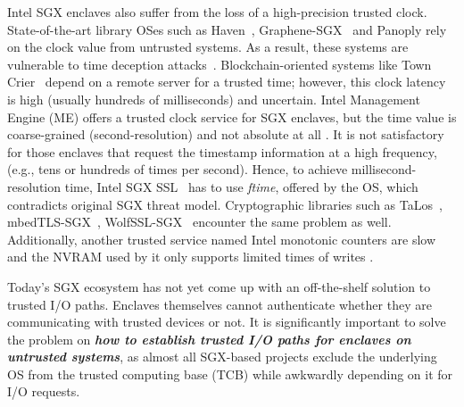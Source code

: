 \documentclass[journal,twocolumn,letterpaper,10pt]{IEEEtran}
\begin{document}
Intel SGX enclaves also suffer from the loss of a high-precision trusted clock. State-of-the-art library OSes such as Haven~\cite{DBLP:journals/tocs/BaumannPH15}, Graphene-SGX~\cite{DBLP:conf/usenix/TsaiPV17} and Panoply \cite{shinde_panoply:_2017} rely on the clock value from  untrusted systems. As a result, these systems are vulnerable to time deception attacks~\cite{DBLP:conf/ccs/ChenZRZ17}. Blockchain-oriented systems like Town Crier~\cite{DBLP:conf/ccs/ZhangCCJS16} depend on a remote server for a trusted time; however, this clock latency is high (usually hundreds of milliseconds) and uncertain. Intel Management Engine (ME) offers a trusted clock service for SGX enclaves, but the time value is coarse-grained (second-resolution) and not absolute at all \cite{intel_psw}. It is not satisfactory for those enclaves that request the timestamp information at a high frequency, (e.g., tens or hundreds of times per second). Hence, to achieve millisecond-resolution time, Intel SGX SSL~\cite{intel_sgx_ssl} has to use \textit{ftime}, offered by the OS, which contradicts original SGX threat model. Cryptographic libraries such as TaLos~\cite{TaLoS}, mbedTLS-SGX~\cite{mbedtls}, WolfSSL-SGX~\cite{wolfSSL} encounter the same problem as well. Additionally, another trusted service named Intel monotonic counters are slow and the NVRAM used by it only supports limited times of writes \cite{DBLP:conf/uss/MateticAKDSGJC17}.

Today's SGX ecosystem has not yet come up with an off-the-shelf solution to trusted I/O paths. Enclaves themselves cannot authenticate whether they are communicating with trusted devices or not. It is significantly important to solve the problem on \textbf{\emph{how to establish trusted I/O paths for enclaves on untrusted systems}}, as almost all SGX-based projects exclude the underlying OS from the trusted computing base (TCB) while awkwardly depending on it for I/O requests.
\end{document}
